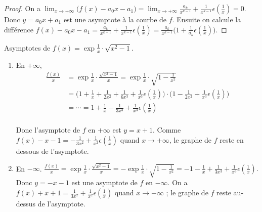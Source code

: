 \documentclass[class=report,crop=false]{standalone}
\begin{document}

\begin{proof}
On a $\lim_{x\to+\infty} \big(f(x)-a_0x-a_1\big)
=\lim_{x\to+\infty}\frac{a_k}{x^{k-1}}+\frac{1}{x^{k-1}}\epsilon(\frac{1}{x})=0$.
Donc $y=a_0x+a_1$ est une asymptote à la courbe de $f$.
Ensuite on calcule la différence $f(x)-a_0x-a_1=\frac{a_k}{x^{k-1}}+\frac{1}{x^{k-1}}\epsilon(\frac{1}{x})
=\frac{a_k}{x^{k-1}}\big(1+\frac{1}{a_k}\epsilon(\frac{1}{x})\big)$.
\end{proof}

\begin{exemple}
Asymptotes de  $f(x)=\exp{\frac1x} \cdot \sqrt{x^2-1}$.


\begin{enumerate}
\item En $+\infty$,
\begin{align*}
\frac{f(x)}{x}
  & = \exp{\frac1x} \cdot\frac{\sqrt{x^2-1}}{x} =\exp{\frac1x} \cdot\sqrt{1-\frac{1}{x^2}} \\
  & = \Big(1+\frac{1}{x}+\frac{1}{2x^2}+\frac{1}{6x^3} +\frac{1}{x^3}\epsilon(\frac1x)\Big)
\cdot\Big(1-\frac{1}{2x^2}+\frac{1}{x^3}\epsilon(\frac{1}{x})\Big) \\
  & = \cdots = 1+\frac{1}{x}-\frac{1}{3x^3} +\frac{1}{x^3}\epsilon(\frac{1}{x}) \\
\end{align*}


Donc l'asymptote de $f$ en $+\infty$ est $y=x+1$. Comme
$f(x)-x-1=-\frac{1}{3x^2}+\frac{1}{x^2}\epsilon(\frac{1}{x})$ quand
$x\to+\infty$, le graphe de $f$ reste en dessous de l'asymptote.

\item En $-\infty$.
$\frac{f(x)}{x}=\exp{\frac1x}\cdot\frac{\sqrt{x^2-1}}{x}
=-\exp{\frac1x}\cdot\sqrt{1-\frac{1}{x^2}}
=-1-\frac{1}{x}+\frac{1}{3x^3}+\frac{1}{x^3}\epsilon(\frac{1}{x}).$
Donc $y=-x-1$ est une asymptote de $f$ en $-\infty$. On a
$f(x)+x+1=\frac{1}{3x^2}+\frac{1}{x^2}\epsilon(\frac{1}{x})$ quand
$x\to-\infty$ ; le graphe de $f$ reste au-dessus de l'asymptote.
\end{enumerate}
\end{exemple}


\end{document}
